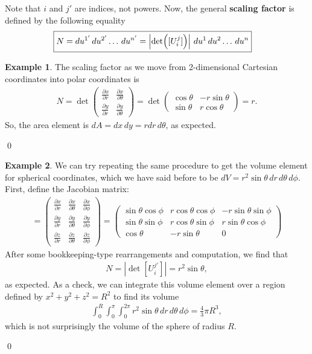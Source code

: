 \documentclass{book}
\theoremstyle{definition}
\newtheorem{exmp}{Example}[section]
\begin{document}
Note that $i$ and $j'$ are indices, not powers. Now, the general \textbf{scaling factor} is defined by the following equality
\begin{align*}
\Aboxed{N = du^{1'}\,du^{2'}\dots\,du^{n'} = \left| \det([U^{j}_{i}])\right| \,du^1\,du^2\dots\,du^{n}}
\end{align*}
\begin{exmp}
The scaling factor as we move from 2-dimensional Cartesian coordinates into polar coordinates is
\begin{align*}
N = \det\begin{pmatrix}
\frac{\partial x}{\partial r} & \frac{\partial x}{\partial \theta}\\
\frac{\partial y}{\partial r} & \frac{\partial y}{\partial \theta}
\end{pmatrix}
=
\det\begin{pmatrix}
\cos\theta & -r\sin\theta\\
\sin\theta & r\cos\theta
\end{pmatrix}
=
r.
\end{align*}
So, the area element is $dA = dx\,dy = rdr\,d\theta$, as expected. 
\end{exmp}\qed
\begin{exmp}
We can try repeating the same procedure to get the volume element for spherical coordinates, which we have said before to be $dV = r^2\sin\theta\,dr\,d\theta\,d\phi$. First, define the Jacobian matrix:
\begin{align*}
[U^{j'}_{i}] = \begin{pmatrix}
\frac{\partial x}{\partial r} & \frac{\partial x}{\partial \theta} & \frac{\partial x}{\partial \phi}\\
\frac{\partial y}{\partial r} & \frac{\partial y}{\partial \theta} & \frac{\partial y}{\partial \phi}\\
\frac{\partial z}{\partial r} & \frac{\partial z}{\partial \theta} & \frac{\partial z}{\partial \phi}
\end{pmatrix}
=
\begin{pmatrix}
\sin\theta\cos\phi & r\cos\theta\cos\phi & -r\sin\theta\sin\phi \\
\sin\theta\sin\phi & r\cos\theta\sin\phi & r\sin\theta\cos\phi \\
\cos\theta & -r\sin\theta & 0
\end{pmatrix}
\end{align*}
After some bookkeeping-type rearrangements and computation, we find that
\begin{align*}
N = \left|\det[U^{j'}_{i}]\right|= r^2\sin\theta,
\end{align*}
as expected. As a check, we can integrate this volume element over a region defined by $x^2+y^2+z^2 = R^2$ to find its volume
\begin{align*}
\int_{0}^{R}\int_{0}^{\pi}\int_{0}^{2\pi}r^2\sin\theta\,dr\,d\theta\,d\phi = \frac{4}{3}\pi R^3,
\end{align*}
which is not surprisingly the volume of the sphere of radius $R$. 
\end{exmp}\qed
\newpage
\end{document}
